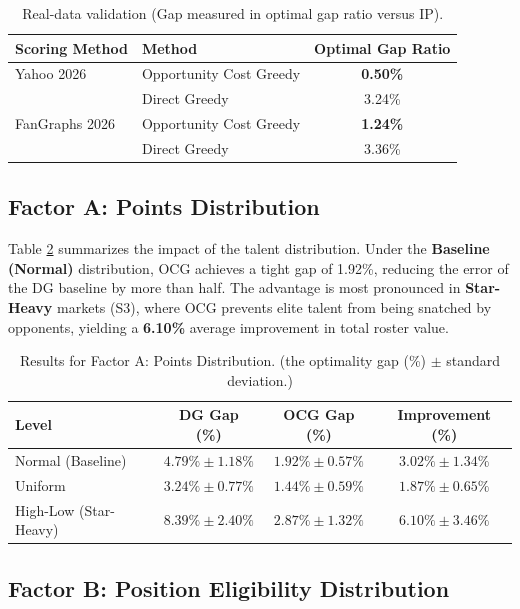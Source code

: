 \documentclass[11pt,a4paper]{article}
\begin{document}
\begin{table}[H]
\centering
\caption{Real-data validation (Gap measured in optimal gap ratio versus IP).}
\label{tab:real_data}
\begin{tabular}{llc}
\toprule
Scoring Method & Method & Optimal Gap Ratio \\
\midrule
Yahoo 2026 & Opportunity Cost Greedy & \textbf{0.50\%} \\
 & Direct Greedy & 3.24\% \\
\midrule
FanGraphs 2026 & Opportunity Cost Greedy & \textbf{1.24\%} \\
 & Direct Greedy & 3.36\% \\
\bottomrule
\end{tabular}
\end{table}

\subsection{Factor A: Points Distribution}

Table \ref{tab:factor_1} summarizes the impact of the talent distribution. Under the \textbf{Baseline (Normal)} distribution, OCG achieves a tight gap of 1.92\%, reducing the error of the DG baseline by more than half. The advantage is most pronounced in \textbf{Star-Heavy} markets (S3), where OCG prevents elite talent from being snatched by opponents, yielding a \textbf{6.10\%} average improvement in total roster value.

\begin{table}[H]
\centering
\caption{Results for Factor A: Points Distribution. (the optimality gap (\%) $\pm$ standard deviation.)}
\label{tab:factor_1}
\begin{tabular}{lccc}
\toprule
Level & DG Gap (\%) & OCG Gap (\%) & Improvement (\%) \\
\midrule
Normal (Baseline) & $4.79\% \pm 1.18\%$ & $\mathbf{1.92\% \pm 0.57\%}$ & $3.02\% \pm 1.34\%$ \\
Uniform & $3.24\% \pm 0.77\%$ & $\mathbf{1.44\% \pm 0.59\%}$ & $1.87\% \pm 0.65\%$ \\
High-Low (Star-Heavy) & $8.39\% \pm 2.40\%$ & $\mathbf{2.87\% \pm 1.32\%}$ & $\mathbf{6.10\% \pm 3.46\%}$ \\
\bottomrule
\end{tabular}
\end{table}

\subsection{Factor B: Position Eligibility Distribution}
\end{document}
